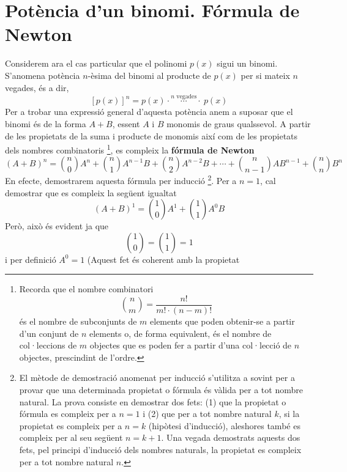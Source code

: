 \section{Potència d'un binomi. Fórmula de Newton}

Considerem ara el cas particular que el polinomi $p(x)$ sigui un
binomi. S'anomena potència $n$-èsima del binomi al producte de $p(x)$
per si mateix $n$ vegades, és a dir,\begin{equation*}
\left[ p(x)\right] ^{n}=p(x)\cdot \overset{n\text{ vegades}}{\cdots }\cdot
~p(x)
\end{equation*}Per a trobar una expressió general d'aquesta potència anem a suposar que
el binomi és de la forma $A+B$, essent $A$ i $B$ monomis de graus
qualssevol. A partir de les propietats de la suma i producte de monomis
així com de les propietats dels nombres combinatoris \footnote{Recorda que el nombre combinatori
\begin{equation*}
\binom{n}{m}=\frac{n!}{m!\cdot (n-m)!}
\end{equation*}és el nombre de subconjunts de $m$ elements que poden obtenir-se a
partir d'un conjunt de $n$ elements o, de forma equivalent, és el nombre de col·leccions de $m$ objectes que es poden fer a partir d'una
col·lecció de $n$ objectes, prescindint de l'ordre.}, es compleix la
\textbf{fórmula de Newton}\begin{equation*}
(A+B)^{n}=\binom{n}{0}A^{n}+\binom{n}{1}A^{n-1}B+\binom{n}{2}A^{n-2}B+\cdots
+\binom{n}{n-1}AB^{n-1}+\binom{n}{n}B^{n}
\end{equation*}En efecte, demostrarem aquesta fórmula per inducció \footnote{El mètode de demostració anomenat per inducció s'utilitza a
sovint per a provar que una determinada propietat o fórmula és vàlida
per a tot nombre natural. La prova consiste en demostrar dos fets:
(1) que la propietat o fórmula es compleix per a $n=1$ i (2) que per a tot nombre natural $k$, si la propietat es compleix per a $n=k$ (hipòtesi
d'inducció), aleshores també es compleix per al seu següent $n=k+1$.
Una vegada demostrats aquests dos fets, pel principi d'inducció
dels nombres naturals, la propietat es compleix per a tot nombre
natural $n$.}. Per a $n=1$, cal demostrar que es compleix la següent
igualtat\begin{equation*}
(A+B)^{1}=\binom{1}{0}A^{1}+\binom{1}{1}A^{0}B
\end{equation*}Però, això és evident ja que\begin{equation*}
\binom{1}{0}=\binom{1}{1}=1
\end{equation*}i per definició $A^{0}=1$ (Aquest fet és coherent amb la propietat
